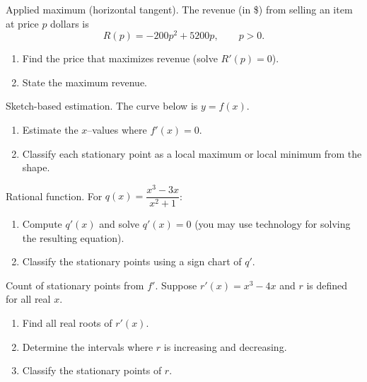 \documentclass[11pt]{article}
\def\textbf#1{#1}%
\newcounter{question}
\begin{document}
\begin{question}
\textbf{Applied maximum (horizontal tangent).}
The revenue (in \$) from selling an item at price $p$ dollars is
\[
R(p)=-200p^{2}+5200p,\qquad p>0.
\]
\begin{enumerate}
  \item Find the price that maximizes revenue (solve $R'(p)=0$).
  \item State the maximum revenue.
\end{enumerate}
\end{question}

\begin{question}
\textbf{Sketch-based estimation.}
The curve below is $y=f(x)$.

\begin{center}
\end{center}

\begin{enumerate}
  \item Estimate the $x$–values where $f'(x)=0$.
  \item Classify each stationary point as a local maximum or local minimum from the shape.
\end{enumerate}
\end{question}

\begin{question}
\textbf{Rational function.}
For $q(x)=\dfrac{x^{3}-3x}{x^{2}+1}$:
\begin{enumerate}
  \item Compute $q'(x)$ and solve $q'(x)=0$ (you may use technology for solving the resulting equation).
  \item Classify the stationary points using a sign chart of $q'$.
\end{enumerate}
\end{question}

\begin{question}
\textbf{Count of stationary points from $f'$.}
Suppose $r'(x)=x^{3}-4x$ and $r$ is defined for all real $x$.
\begin{enumerate}
  \item Find all real roots of $r'(x)$.
  \item Determine the intervals where $r$ is increasing and decreasing.
  \item Classify the stationary points of $r$.
\end{enumerate}
\end{question}
\end{document}
